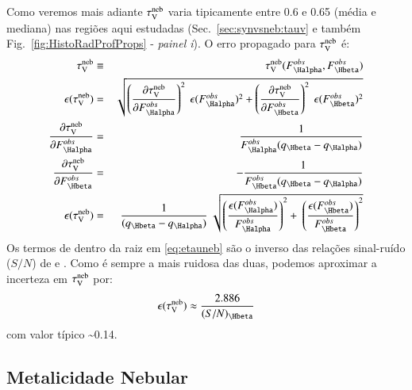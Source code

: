 Como veremos mais adiante $\tau_{\mathrm{V}}^{\mathrm{neb}}$ varia tipicamente entre 0.6 e 0.65 (média e mediana) nas regiões aqui
estudadas (Sec.\ \ref{sec:synvsneb:tauv} e também Fig.\ \ref{fig:HistoRadProfProps}
- {\em painel i}). O erro propagado para $\tau_{\mathrm{V}}^{\mathrm{neb}}$ é:
\begin{eqnarray}
	\tauVN &\equiv& \tauVN(F_{\Halpha}^{obs}, F_{\Hbeta}^{obs}) \\
	\epsilon (\tauVN) &=& \sqrt{\left(\del{\tauVN}{F_{\Halpha}^{obs}}\right)^2 \
\epsilon (F_{\Halpha}^{obs})^2 + \left(\del{\tauVN}{F_{\Hbeta}^{obs}}\right)^2 \
\epsilon (F_{\Hbeta}^{obs})^2 } \\
	\del{\tauVN}{F_{\Halpha}^{obs}} &=& \frac{1}{F_{\Halpha}^{obs} (q_{\Hbeta} - q_{\Halpha})} \\
	\del{\tauVN}{F_{\Hbeta}^{obs}} &=& - \frac{1}{F_{\Hbeta}^{obs} (q_{\Hbeta} - q_{\Halpha})} \\
	\epsilon (\tauVN) &=& \frac{1}{(q_{\Hbeta} - q_{\Halpha})} \
\sqrt{\left(\frac{\epsilon (F_{\Halpha}^{obs})}{F_{\Halpha}^{obs}}\right)^2 + \
\left(\frac{\epsilon (F_{\Hbeta}^{obs})}{F_{\Hbeta}^{obs}}\right)^2 }
	\label{eq:etauneb}
\end{eqnarray}
\noindent Os termos de dentro da raiz em \eqref{eq:etauneb} são o inverso das relações sinal-ruído
($S/N$) de \Halpha e \Hbeta. Como \Hbeta é sempre a mais ruidosa das duas, podemos aproximar a
incerteza em $\tau_{\mathrm{V}}^{\mathrm{neb}}$ por:
\begin{equation}
	\epsilon (\tauVN) \approx \frac{2.886}{(S/N)_{\Hbeta}}
	\label{eq:etaunebaprox}
\end{equation}
\noindent com valor típico \sim 0.14.

\subsection{Metalicidade Nebular}
\label{apendice:organeb:datacube:Zneb}

